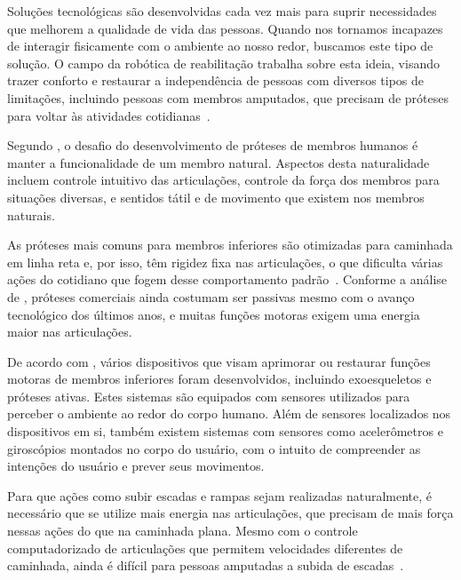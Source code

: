 Soluções tecnológicas são desenvolvidas cada vez mais para suprir necessidades que melhorem a qualidade de vida das pessoas. Quando nos tornamos incapazes de interagir fisicamente com o ambiente ao nosso redor, buscamos este tipo de solução. O campo da robótica de reabilitação trabalha sobre esta ideia, visando trazer conforto e restaurar a independência de pessoas com diversos tipos de limitações, incluindo pessoas com membros amputados, que precisam de próteses para voltar às atividades cotidianas~\cite{siciliano:2008springer}.

Segundo , o desafio do desenvolvimento de próteses de membros humanos é manter a funcionalidade de um membro natural. Aspectos desta naturalidade incluem controle intuitivo das articulações, controle da força dos membros para situações diversas, e sentidos tátil e de movimento que existem nos membros naturais.

As próteses mais comuns para membros inferiores são otimizadas para caminhada em linha reta e, por isso, têm rigidez fixa nas articulações, o que dificulta várias ações do cotidiano que fogem desse comportamento padrão~\cite{pew:2017}. Conforme a análise de , próteses comerciais ainda costumam ser passivas mesmo com o avanço tecnológico dos últimos anos, e muitas funções motoras exigem uma energia maior nas articulações.

De acordo com , vários dispositivos que visam aprimorar ou restaurar funções motoras de membros inferiores foram desenvolvidos, incluindo exoesqueletos e próteses ativas. Estes sistemas são equipados com sensores utilizados para perceber o ambiente ao redor do corpo humano. Além de sensores localizados nos dispositivos em si, também existem sistemas com sensores como acelerômetros e giroscópios \cite{invensense:imu_mpu} montados no corpo do usuário, com o intuito de compreender as intenções do usuário e prever seus movimentos.

Para que ações como subir escadas e rampas sejam realizadas naturalmente, é necessário que se utilize mais energia nas articulações, que precisam de mais força nessas ações do que na caminhada plana. Mesmo com o controle computadorizado de articulações que permitem velocidades diferentes de caminhada, ainda é difícil para pessoas amputadas a subida de escadas~\cite{dedic:2011}.

